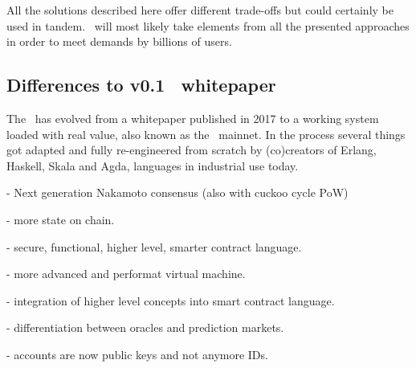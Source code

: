 All the solutions described here offer different trade-offs but could certainly
be used in tandem. \aet\ will most likely take elements from all the presented
approaches in order to meet demands by billions of users.



\subsection{Differences to v0.1 \blockchain\ whitepaper}
The \blockchain\ has evolved from a whitepaper published in 2017 to a working
system loaded with real value, also known as the \aet\ mainnet. In the process
several things got adapted and fully re-engineered from scratch by (co)creators
of Erlang, Haskell, Skala and Agda, languages in industrial use today.

- Next generation Nakamoto consensus (also with cuckoo cycle PoW)

- more state on chain.

- secure, functional, higher level, smarter contract language.

- more advanced and performat virtual machine.

- integration of higher level concepts into smart contract language.

- differentiation between oracles and prediction markets.

- accounts are now public keys and not anymore IDs.

